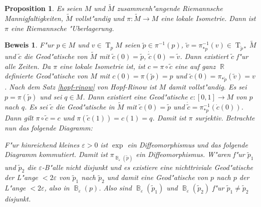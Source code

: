\documentclass[paper=A4, twoside, chapterprefix=true, bibliography=totoc, headsepline]{scrbook}
\let\temp\phi{}
\let\phi\varphi{}
\let\varphi\temp{}
\let\temp\theta{}
\let\theta\vartheta{}
\let\vartheta\temp{}
\let\temp\epsilon{}
\let\epsilon\varepsilon{}
\let\varepsilon\temp{}
\let\temp\rho{}
\let\rho\varrho{}
\let\varrho\temp{}
\DeclareMathOperator{\R}{\mathbb{R}}
\DeclareMathOperator{\B}{\mathbb{B}} %
\DeclareMathOperator{\T}{T}         %
\theoremstyle{plain}
\newtheorem{Prop}[Dfn]{Proposition}
\theoremstyle{nonumberplain}
\newtheorem{bew}{Beweis}
\theoremstyle{empty}
\theoremstyle{break}
\begin{document}
\begin{Prop}\label{prop-9-12}
  Es seien $M$ und $\tilde M$ zusammenh"angende Riemannsche Mannigfaltigkeiten, $\tilde M$ vollst"andig und $\pi: \tilde M \to M$ eine lokale Isometrie. Dann ist $\pi$ eine Riemannsche "Uberlagerung.
\end{Prop}

\begin{bew}
  F"ur $p \in M$ und $v \in \T_pM$ seien $\tilde p \in \pi^{-1}(p)$, $\tilde v = \pi_{*p}^{-1}(v) \in \T_{\tilde p *}\tilde M$ und $\tilde c$ die Geod"atische von $\tilde M$ mit $\tilde c(0) = \tilde p$, $\dot{\tilde{c}}(0) = \tilde v$.
  Dann existiert $\tilde c$ f"ur alle Zeiten. Da $\pi$ eine lokale Isometrie ist, ist $c = \pi \circ \tilde c$ eine auf ganz $\R$ definierte Geod"atische von $M$ mit $c(0) = \pi(\tilde p) = p$ und $\tilde c(0) = \pi_{* \tilde p}(\tilde v) = v$.
  Nach dem Satz \ref{hopf-rinow} von Hopf-Rinow ist $M$ damit vollst"andig. Es sei $p = \pi(\tilde p)$ und sei $q \in M$.
  Dann existiert eine Geod"atische $c: [0,1] \to M$ von $p$ nach $q$. Es sei $\tilde c$ die Geod"atische in $\tilde M$ mit $\tilde c(0) = \tilde p$ und $\dot{\tilde{c}} = \pi_{*p}^{-1}(\dot c(0))$.
  Dann gilt $\pi \circ \tilde c = c$ und $\pi(\tilde c(1)) = c(1) = q$.
  Damit ist $\pi$ surjektiv. Betrachte nun das folgende Diagramm:
  \begin{center}\end{center}
  F"ur hinreichend kleines $\epsilon > 0$ ist $\exp$ ein Diffeomorphismus und das folgende Diagramm kommutiert.
  Damit ist $\pi_{\B_\epsilon(\tilde p)}$ ein Diffeomorphismus.
  W"aren f"ur $\tilde p_1$ und $\tilde p_2$ die $\epsilon$-B"alle nicht disjunkt und es existiere eine nichttriviale Geod"atische der L"ange $< 2 \epsilon$ von $\tilde p_1$ nach $\tilde p_2$ und damit eine Geod"atische von $p$ nach $p$ der L"ange $< 2 \epsilon$, also in $\B_\epsilon(p)$.
  Also sind $\B_\epsilon(\tilde p_1)$ und $\B_\epsilon(\tilde p_2)$ f"ur $\tilde p_1 \ne \tilde p_2$ disjunkt.
\end{bew}
\end{document}
